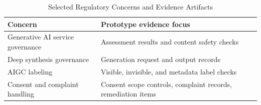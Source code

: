 \begin{table}[H]
\centering
\caption{Selected Regulatory Concerns and Evidence Artifacts}
\label{tab:regulatory-mapping}
\footnotesize
\begin{tabularx}{\columnwidth}{@{}p{} X@{}}
\toprule
Concern & Prototype evidence focus \\
\midrule
Generative AI service governance & Assessment results and content safety checks \\
Deep synthesis governance & Generation request and output records \\
AIGC labeling & Visible, invisible, and metadata label checks \\
Consent and complaint handling & Consent scope controls, complaint records, remediation items \\
\bottomrule
\end{tabularx}
\end{table}
